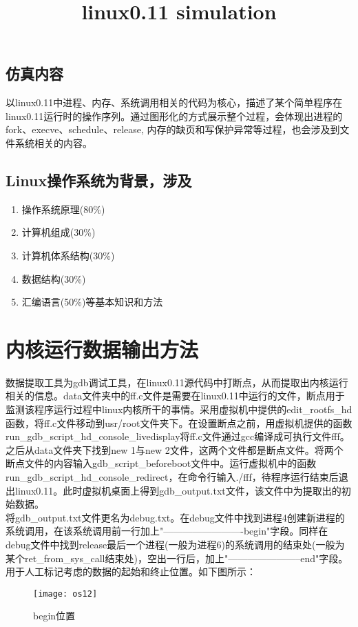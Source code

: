 \documentclass[]{report}
\title{linux0.11 simulation}
\begin{document}
\section{仿真内容}
以linux0.11中进程、内存、系统调用相关的代码为核心，描述了某个简单程序在linux0.11运行时的操作序列。通过图形化的方式展示整个过程，会体现出进程的fork、execve、schedule、release, 内存的缺页和写保护异常等过程，也会涉及到文件系统相关的内容。

\section*{Linux操作系统为背景，涉及}
\begin{enumerate}[-]
	\item 操作系统原理(80\%)
	\item 计算机组成(30\%)
	\item 计算机体系结构(30\%)
	\item 数据结构(30\%)
	\item 汇编语言(50\%)等基本知识和方法
\end{enumerate}



\chapter{内核运行数据输出方法}
数据提取工具为gdb调试工具，在linux0.11源代码中打断点，从而提取出内核运行相关的信息。data文件夹中的ff.c文件是需要在linux0.11中运行的文件，断点用于监测该程序运行过程中linux内核所干的事情。采用虚拟机中提供的edit\_rootfs\_hd函数，将ff.c文件移动到usr/root文件夹下。在设置断点之前，用虚拟机提供的函数run\_gdb\_script\_hd\_console\_livedisplay将ff.c文件通过gcc编译成可执行文件fff。之后从data文件夹下找到new 1与new 2文件，这两个文件都是断点文件。将两个断点文件的内容输入gdb\_script\_beforeboot文件中。运行虚拟机中的函数run\_gdb\_script\_hd\_console\_redirect，在命令行输入./fff，待程序运行结束后退出linux0.11。此时虚拟机桌面上得到gdb\_output.txt文件，该文件中为提取出的初始数据。\\

将gdb\_output.txt文件更名为debug.txt。在debug文件中找到进程4创建新进程的系统调用，在该系统调用前一行加上"-------------------------begin"字段。同样在debug文件中找到release最后一个进程(一般为进程6)的系统调用的结束处(一般为某个ret\_from\_sys\_call结束处)，空出一行后，加上"-----------------------end"字段。用于人工标记考虑的数据的起始和终止位置。如下图所示：
\begin{figure}[H]%
	\centering  %
	\texttt{[image: os12]}  
	\caption{begin位置}  %
	\label{fig14}
\end{figure}
\end{document}
